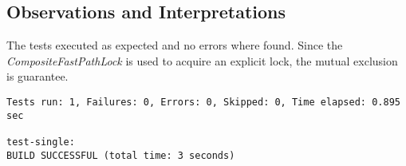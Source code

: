 
\subsection{Observations and Interpretations}

\par
The tests executed as expected and no errors where found. Since the \textit{CompositeFastPathLock} is used to acquire an explicit lock, the mutual exclusion is guarantee.

\begin{lstlisting}[frame=single,breaklines=true]
Tests run: 1, Failures: 0, Errors: 0, Skipped: 0, Time elapsed: 0.895 sec

test-single:
BUILD SUCCESSFUL (total time: 3 seconds)
\end{lstlisting}




